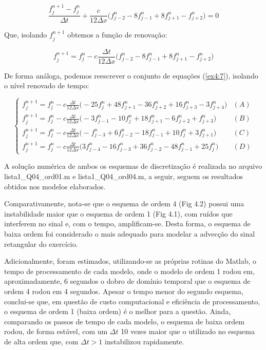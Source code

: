 \documentclass[11pt]{article}
\begin{document}
\begin{equation}
    \frac{f^{n+1}_{j} - f^{n}_{j}}{\Delta{t}} + \frac{c}{12\Delta{x}}\biggl( f^{n}_{j-2} - 8f^{n}_{j-1} + 8f^{n}_{j+1} - f^{n}_{j+2} \bigg) = 0
    \label{ex4:8}
\end{equation}

Que, isolando \(f^{n+1}_{j}\) obtemos a função de renovação:

\begin{equation}
    f^{n+1}_{j} = f^{n}_{j}-c\frac{\Delta{t}}{12\Delta{x}}\biggl( f^{n}_{j-2} - 8f^{n}_{j-1} + 8f^{n}_{j+1} - f^{n}_{j+2} \bigg)    
    \label{ex4:9}
\end{equation}

De forma análoga, podemos reescrever o conjunto de equações
(\ref{ex4:7}), isolando o nível renovado de tempo:

\begin{equation}
    \begin{cases}
            f^{n+1}_{j} = f^{n}_{j}-c\frac{\Delta{t}}{12\Delta{x}}\biggl( - 25f^{n}_{j} + 48f^{n}_{j+1} - 36f^{n}_{j+2} + 16f^{n}_{j+3} - 3f^{n}_{j+4} \bigg) & (A) \\
            f^{n+1}_{j} = f^{n}_{j}-c\frac{\Delta{t}}{12\Delta{x}}\biggl( - 3f^{n}_{j-1} - 10f^{n}_{j} + 18f^{n}_{j+1} - 6f^{n}_{j+2} + f^{n}_{j+3}  \bigg) & (B) \\
            f^{n+1}_{j} = f^{n}_{j}-c\frac{\Delta{t}}{12\Delta{x}}\biggl( - f^{n}_{j-3} + 6f^{n}_{j-2} - 18f^{n}_{j-1} + 10f^{n}_{j} + 3f^{n}_{j+1} \bigg) & (C) \\
            f^{n+1}_{j} = f^{n}_{j}-c\frac{\Delta{t}}{12\Delta{x}}\biggl( 3f^{n}_{j-4} - 16f^{n}_{j-3} + 36f^{n}_{j-2} - 48f^{n}_{j-1} + 25f^{n}_{j} \bigg) & (D)
            \label{ex4:10}
    \end{cases}
\end{equation}

A solução numérica de ambos os esquemas de discretização é realizada no
arquivo lista1\_Q04\_ord01.m e lista1\_Q04\_ord04.m, a seguir, seguem os
resultados obtidos nos modelos elaborados.

Comparativamente, nota-se que o esquema de ordem 4 (Fig 4.2) possui uma
instabilidade maior que o esquema de ordem 1 (Fig 4.1), com ruídos que
interferem no sinal e, com o tempo, amplificam-se. Desta forma, o
esquema de baixa ordem foi considerado o mais adequado para modelar a
advecção do sinal retangular do exercício.

Adicionalmente, foram estimados, utilizando-se as próprias rotinas do
Matlab, o tempo de processamento de cada modelo, onde o modelo de ordem
1 rodou em, aproximadamente, 6 segundos o dobro de domínio temporal que
o esquema de ordem 4 rodou em 4 segundos. Apesar o tempo menor do
segundo esquema, conclui-se que, em questão de custo computacional e
eficiência de processamento, o esquema de ordem 1 (baixa ordem) é o
melhor para a questão. Ainda, comparando os passos de tempo de cada
modelo, o esquema de baixa ordem rodou, de forma estável, com um
\(\Delta{t}\) 10 vezes maior que o utilizado no esquema de alta ordem
que, com \(\Delta{t} > 1\) instabilizou rapidamente.
\end{document}
